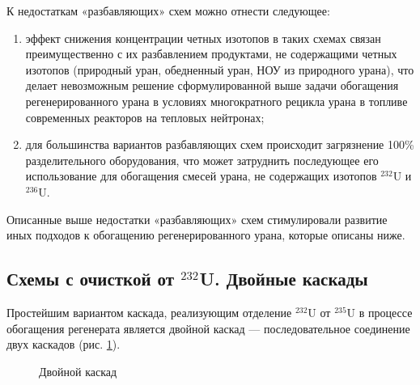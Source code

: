 К недостаткам «разбавляющих» схем можно отнести следующее:

\begin{enumerate}
  \item	эффект снижения концентрации четных изотопов в таких схемах связан преимущественно с их разбавлением продуктами, не содержащими четных изотопов (природный уран, обедненный уран, НОУ из природного урана), что делает невозможным решение сформулированной выше задачи обогащения регенерированного урана в условиях многократного рецикла урана в топливе современных реакторов на тепловых нейтронах;
  \item	 для большинства вариантов разбавляющих схем происходит загрязнение 100\% разделительного оборудования, что может затруднить последующее его использование для обогащения смесей урана, не содержащих изотопов $^{232}$U и $^{236}$U.
\end{enumerate}

Описанные выше недостатки «разбавляющих» схем стимулировали развитие иных подходов к обогащению регенерированного урана, которые описаны ниже.


\subsection{Схемы с очисткой от $^{232}$U. Двойные каскады}\label{ch1/dvoynoy}

Простейшим вариантом каскада, реализующим отделение $^{232}$U от $^{235}$U в процессе обогащения регенерата является двойной каскад --- последовательное соединение двух каскадов (рис. \ref{fig:double_ru}). 

\begin{figure}[ht]
  \caption{Двойной каскад}\label{fig:double_ru}
\end{figure}

